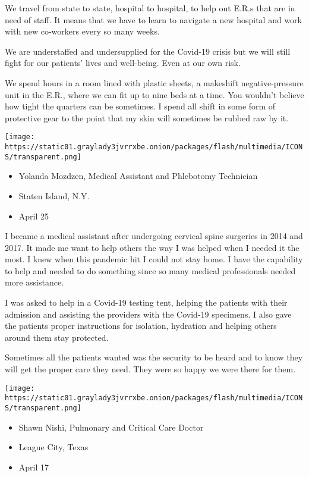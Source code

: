 We travel from state to state, hospital to hospital, to help out E.R.s
that are in need of staff. It means that we have to learn to navigate a
new hospital and work with new co-workers every so many weeks.

We are understaffed and undersupplied for the Covid-19 crisis but we
will still fight for our patients' lives and well-being. Even at our own
risk.

We spend hours in a room lined with plastic sheets, a makeshift
negative-pressure unit in the E.R., where we can fit up to nine beds at
a time. You wouldn't believe how tight the quarters can be sometimes. I
spend all shift in some form of protective gear to the point that my
skin will sometimes be rubbed raw by it.

\texttt{[image: https://static01.graylady3jvrrxbe.onion/packages/flash/multimedia/ICONS/transparent.png]}

\begin{itemize}
\tightlist
\item
  Yolanda Mozdzen, Medical Assistant and Phlebotomy Technician
\item
  Staten Island, N.Y.
\item
  April 25
\end{itemize}

I became a medical assistant after undergoing cervical spine surgeries
in 2014 and 2017. It made me want to help others the way I was helped
when I needed it the most. I knew when this pandemic hit I could not
stay home. I have the capability to help and needed to do something
since so many medical professionals needed more assistance.

I was asked to help in a Covid-19 testing tent, helping the patients
with their admission and assisting the providers with the Covid-19
specimens. I also gave the patients proper instructions for isolation,
hydration and helping others around them stay protected.

Sometimes all the patients wanted was the security to be heard and to
know they will get the proper care they need. They were so happy we were
there for them.

\texttt{[image: https://static01.graylady3jvrrxbe.onion/packages/flash/multimedia/ICONS/transparent.png]}

\begin{itemize}
\tightlist
\item
  Shawn Nishi, Pulmonary and Critical Care Doctor
\item
  League City, Texas
\item
  April 17
\end{itemize}

